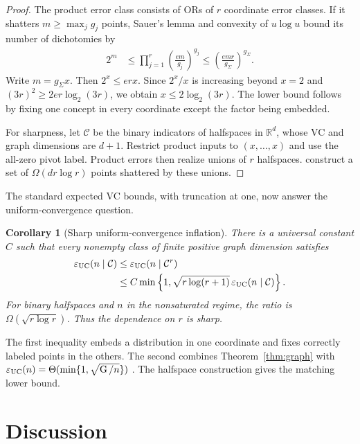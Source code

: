\documentclass[twoside]{article}
\newtheorem{corollary}[theorem]{Corollary}
\newcommand{\G}{\operatorname{G}}
\newcommand{\cC}{\mathcal C}
\begin{document}
\begin{proof}
The product error class consists of ORs of $r$ coordinate error classes. If it shatters $m\geq\max_jg_j$ points, Sauer's lemma and convexity of $u\log u$ bound its number of dichotomies by \[
\begin{aligned}
2^m&\leq\prod_{j=1}^r\left(\frac{em}{g_j}\right)^{g_j}
\leq\left(\frac{emr}{g_\Sigma}\right)^{g_\Sigma}.
\end{aligned}
\] Write $m=g_\Sigma x$. Then $2^x\leq erx$. Since $2^x/x$ is increasing beyond $x=2$ and $(3r)^2\geq2er\log_2(3r)$, we obtain $x\leq2\log_2(3r)$. The lower bound follows by fixing one concept in every coordinate except the factor being embedded.

For sharpness, let $\cC$ be the binary indicators of halfspaces in $\mathbb R^d$, whose VC and graph dimensions are $d+1$. Restrict product inputs to $(x,\ldots,x)$ and use the all-zero pivot label. Product errors then realize unions of $r$ halfspaces. \citet{csikos2019} construct a set of $\Omega(dr\log r)$ points shattered by these unions.
\end{proof}

The standard expected VC bounds, with truncation at one, now answer the uniform-convergence question.

\begin{corollary}[Sharp uniform-convergence inflation]\label{cor:uc}
There is a universal constant $C$ such that every nonempty class of finite positive graph dimension satisfies
\begin{align*}
\varepsilon_{\rm UC}(n\mid\cC)&\leq\varepsilon_{\rm UC}(n\mid\cC^r)\\
&\leq C\min\left\{1,\sqrt{r\log(r+1)}\,\varepsilon_{\rm UC}(n\mid\cC)\right\}.
\end{align*}
For binary halfspaces and $n$ in the nonsaturated regime, the ratio is $\Omega(\sqrt{r\log r})$. Thus the dependence on $r$ is sharp.
\end{corollary}

The first inequality embeds a distribution in one coordinate and fixes correctly labeled points in the others. The second combines Theorem~\ref{thm:graph} with $\varepsilon_{\rm UC}(n)=\Theta(\min\{1,\sqrt{\G/n}\})$ \citep{daniely2015}. The halfspace construction gives the matching lower bound.

\section{Discussion}
\end{document}
